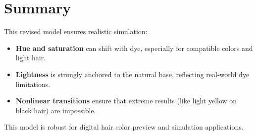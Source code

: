 \documentclass[12pt]{article}
\begin{document}
\section*{Summary}
This revised model ensures realistic simulation:
\begin{itemize}
    \item \textbf{Hue and saturation} can shift with dye, especially for compatible colors and light hair.
    \item \textbf{Lightness} is strongly anchored to the natural base, reflecting real-world dye limitations.
    \item \textbf{Nonlinear transitions} ensure that extreme results (like light yellow on black hair) are impossible.
\end{itemize}
This model is robust for digital hair color preview and simulation applications.
\end{document}
